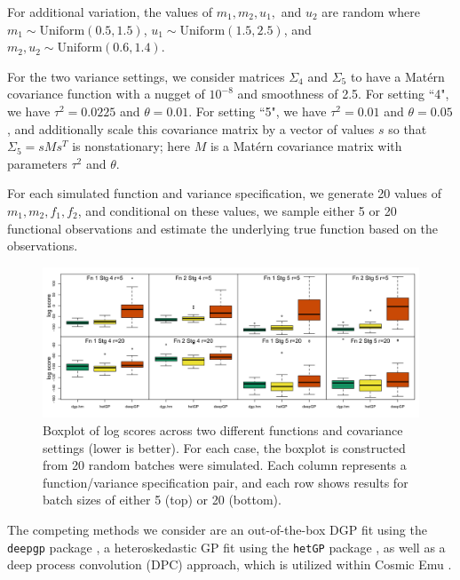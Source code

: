\documentclass[11pt]{article}
\begin{document}
For additional variation, the values of $m_1, m_2, u_1,$ and $u_2$ are random where 
$m_1 \sim \text{Uniform}(0.5,1.5)$, $u_1 \sim \text{Uniform}(1.5,2.5)$, and $m_2,u_2 
\sim \text{Uniform}(0.6,1.4)$. 
      
For the two variance settings, we consider matrices $\Sigma_4$ and $\Sigma_5$ to 
have a Mat\'ern covariance function with a nugget of $10^{-8}$ and smoothness of 2.5. 
For setting ``4", we have $\tau^2=0.0225$ and $\theta=0.01$. For setting ``5", we have 
$\tau^2=0.01$ and $\theta=0.05$, and additionally scale this covariance matrix by 
a vector of values $s$ so that $\Sigma_5 = s M s^T$ is nonstationary; here $M$ is 
a Mat\'ern covariance matrix with parameters $\tau^2$ and $\theta$.

For each simulated function and variance specification, we generate 20 values of 
$m_1, m_2, f_1, f_2$, and conditional on these values, we sample either 5 or 20 
functional observations and estimate the underlying true function based on the observations.

\begin{figure}[t]
    \centering
    \includegraphics[width=6in]{sims_logS.png}
    \caption{Boxplot of log scores across two different functions and covariance 
             settings (lower is better). For each case, the boxplot is constructed 
             from 20 random batches were simulated. Each column represents a function/variance 
             specification pair, and each row shows results for batch sizes of either 
             5 (top) or 20 (bottom).}
    \label{fig:sims_logS}
\end{figure}

The competing methods we consider are an out-of-the-box DGP fit using the 
\texttt{deepgp} package \citep{sauer2023active}, a heteroskedastic GP fit using 
the \texttt{hetGP} package \citep{binois2018practical, binois2021hetgp}, as well 
as a deep process convolution (DPC) approach, which is utilized within Cosmic 
Emu \citep{moran2023mira}. 
\end{document}
